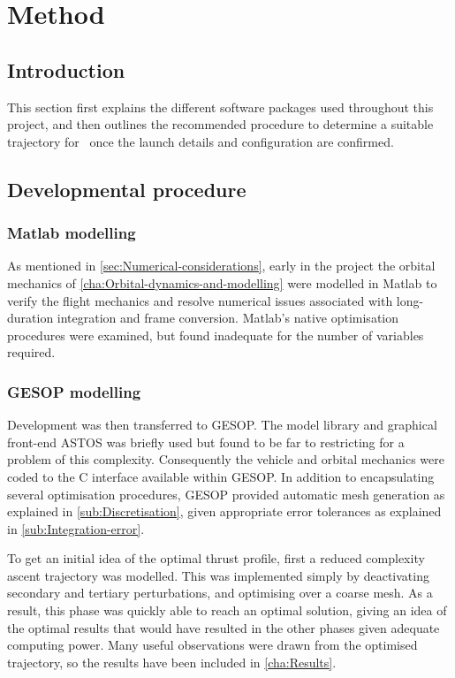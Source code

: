 \chapter{Method} \label{cha:Method}

\section{Introduction} \label{sec:Method-intro}

This section first explains the different software packages used throughout this project, and then outlines the recommended procedure to determine a suitable trajectory for \BW\ once the launch details and configuration are confirmed.

\section{Developmental procedure} \label{sec:Development}

\subsection{Matlab modelling} \label{sub:Matlab}

As mentioned in \autoref{sec:Numerical-considerations}, early in the project the orbital mechanics of \autoref{cha:Orbital-dynamics-and-modelling} were modelled in Matlab to verify the flight mechanics and resolve numerical issues associated with long-duration integration and frame conversion. Matlab's native optimisation procedures were examined, but found inadequate for the number of variables required.

\subsection{GESOP modelling} \label{sub:GESOP}

Development was then transferred to GESOP. The model library and graphical front-end ASTOS was briefly used but found to be far to restricting for a problem of this complexity. Consequently the vehicle and orbital mechanics were coded to the C interface available within GESOP. In addition to encapsulating several optimisation procedures, GESOP provided automatic mesh generation as explained in \autoref{sub:Discretisation}, given appropriate error tolerances as explained in \autoref{sub:Integration-error}.

To get an initial idea of the optimal thrust profile, first a reduced complexity ascent trajectory was modelled. This was implemented simply by deactivating secondary and tertiary perturbations, and optimising over a coarse mesh. As a result, this phase was quickly able to reach an optimal solution, giving an idea of the optimal results that would have resulted in the other phases given adequate computing power. Many useful observations were drawn from the optimised trajectory, so the results have been included in \autoref{cha:Results}.

